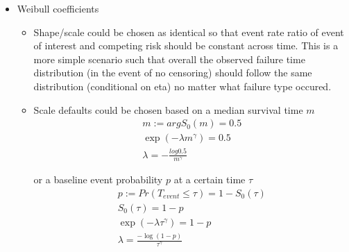 \documentclass[11pt,a4paper]{article}
\begin{document}
\begin{itemize}
\begin{itemize}
    \end{itemize}
    \item Weibull coefficients
    \begin{itemize}
        \item Shape/scale could be chosen as identical so that event rate ratio of event of interest and competing risk should be constant across time. This is a more simple scenario such that overall the observed failure time distribution (in the event of no censoring) should follow the same distribution (conditional on eta) no matter what failure type occured. 
        \item Scale defaults could be chosen based on a median survival time $m$
        \begin{align*}
        m:= arg{ S_0(m) = 0.5}\\
        \exp(-\lambda m^{\gamma}) = 0.5 \\
         \lambda = -\frac{log 0.5}{m ^{\gamma}}
        \end{align*}

        or a baseline event probability $p$ at a certain time $\tau$
        \begin{align*}
        p:= Pr(T_{event} \leq \tau) = 1 - S_0(\tau) \\
        S_0(\tau) = 1-p\\
        \exp(-\lambda \tau ^ {\gamma}) = 1-p \\
        \lambda = \frac{-\log(1-p)}{\tau^{\gamma}}
        \end{align*}
    \end{itemize}
\end{itemize}
\end{document}
